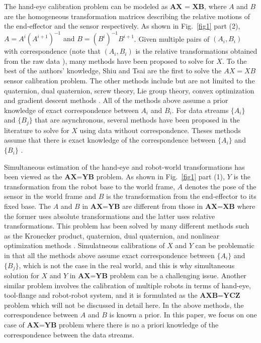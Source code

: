 \documentclass[letterpaper, 10 pt, conference]{ieeeconf}  %
\begin{document}
The hand-eye calibration problem can be modeled as $\textbf{AX = XB}$, where $A$ and $B$ are the homogeneous transformation matrices describing  the relative motions of the end-effector and the  sensor respectively. As shown in Fig.~\ref{fig1} part (2), {\color{red}$A = A^{i}(A^{i+1})^{-1}$ and  $B = (B^{i})^{-1}B^{i+1}$}. Given multiple pairs of $(A_i,B_i)$ with correspondence (note that $(A_i,B_i)$ is the relative transformations obtained from the raw data ), many methods have been proposed to solve for $X$. To the best of the authors' knowledge, Shiu \cite{Shiu1989} and Tsai \cite{Tsai1989} are the first to solve the $AX = XB$ sensor calibration problem. The other methods include but are not limited to the quaternion, dual quaternion, screw theory, Lie group theory, convex optimization and gradient descent methods \cite{Wang1992,Park1994,Horaud1995,Daniilidis1999,Fassi2005,Zhao2011,Ackerman2014a}. All of the methods above assume a prior knowledge of exact correspondence between $A_i$ and $B_i$. For data streams $\{A_i\}$ and $\{B_j\}$ that are asynchronous, several methods have been proposed in the literature to solve for $X$ using data without correspondence.  Theses methods assume that there is exact knowledge of the correspondence between $\{A_i\}$ and $\{B_i\}$ \cite{Ackerman2013a,Ackerman2013,Ackerman2014}.

Simultaneous estimation of the hand-eye and robot-world transformations has been viewed as the $\textbf{AX=YB}$ problem. As shown in Fig.~\ref{fig1} part (1), $Y$ is the transformation from the robot base to the world frame, $A$ denotes the pose of the sensor in the world frame and $B$ is the transformation from the end-effector to its fixed base. The $A$ and $B$ in $\textbf{AX=YB}$ are different from those in $\textbf{AX=XB}$ where the former uses absolute transformations and the latter uses relative transformations. This problem has been solved by many different methods such as the Kronecker product, quaternion, dual quaternion, and nonlinear optimization methods \cite{Zhuang1994,dornaika1998simultaneous,Hirsh2001, ernst2012non,strobl2006optimal,Li2010,Shah2013,Heller2014}. Simulatneous calibrations of $X$ and $Y$ can be problematic in that all the methods above assume exact correspondence between $\{A_i\}$ and $\{B_j\}$, which is not the case in the real world, and this is why simultaneous solution for $X$ and $Y$ in $\textbf{AX=YB}$ problem can be a challenging issue. Another similar problem involves the calibration of multiple robots in terms of hand-eye, tool-flange and robot-robot system, and it is formulated as the $\textbf{AXB=YCZ}$ problem \cite{Wang2014} which will not be discussed in detail here. In the above methods, the correspondence between $A$ and $B$ is known a prior. In this paper, we focus on one case of $\textbf{AX=YB}$ problem where there is  no a priori knowledge of the correspondence between the data streams.
\end{document}
